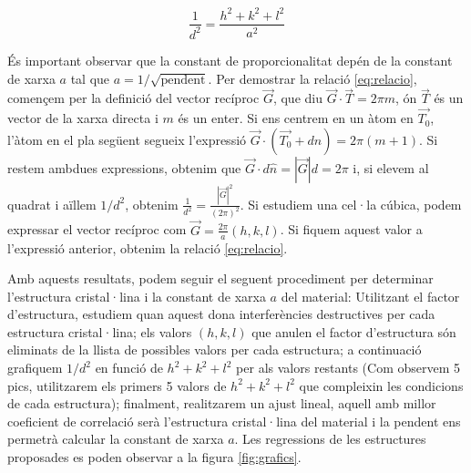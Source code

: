 \documentclass[a4paper, 11pt]{article}
\begin{document}
\begin{equation}
    \frac{1}{d^2} = \frac{h^2 + k^2 + l^2}{a^2}
    \label{eq:relacio}
\end{equation}

\noindent És important observar que la constant de proporcionalitat depén de la constant de xarxa $a$ tal que $a = 1/\sqrt{\text{pendent}}$. Per demostrar la relació \ref{eq:relacio}, començem per la definició del vector recíproc $\vec{G}$, que diu $\vec{G} · \vec{T} = 2\pi m$, ón $\vec{T}$ és un vector de la xarxa directa i $m$ és un enter. Si ens centrem en un àtom en $\vec{T_0}$, l'àtom en el pla següent segueix l'expressió $\vec{G} · (\vec{T_0} + d\hat{n}) = 2\pi (m+1)$. Si restem ambdues expressions, obtenim que $\vec{G} · d\hat{n} = |\vec{G}|d= 2\pi$ i, si elevem al quadrat i aïllem $1/d^2$, obtenim $\frac{1}{d^2} = \frac{|\vec{G}|^2}{(2\pi)^2}$. Si estudiem una cel·la cúbica, podem expressar el vector recíproc com $\vec{G} = \frac{2\pi}{a}(h,k,l)$. Si fiquem aquest valor a l'expressió anterior, obtenim la relació \ref{eq:relacio}.

\vspace{5mm}

\noindent Amb aquests resultats, podem seguir el seguent procediment per determinar l'estructura cristal·lina i la constant de xarxa $a$ del material: Utilitzant el factor d'estructura, estudiem quan aquest dona interferències destructives per cada estructura cristal·lina; els valors $(h,k,l)$ que anulen el factor d'estructura són eliminats de la llista de possibles valors per cada estructura; a continuació grafiquem $1/d^2$ en funció de $h^2 + k^2 + l^2$ per als valors restants (Com observem 5 pics, utilitzarem els primers 5 valors de $h^2 + k^2 + l^2$ que compleixin les condicions de cada estructura); finalment, realitzarem un ajust lineal, aquell amb millor coeficient de correlació serà l'estructura cristal·lina del material i la pendent ens permetrà calcular la constant de xarxa $a$. Les regressions de les estructures proposades es poden observar a la figura \ref{fig:grafics}.

\vspace{5mm}
\end{document}
